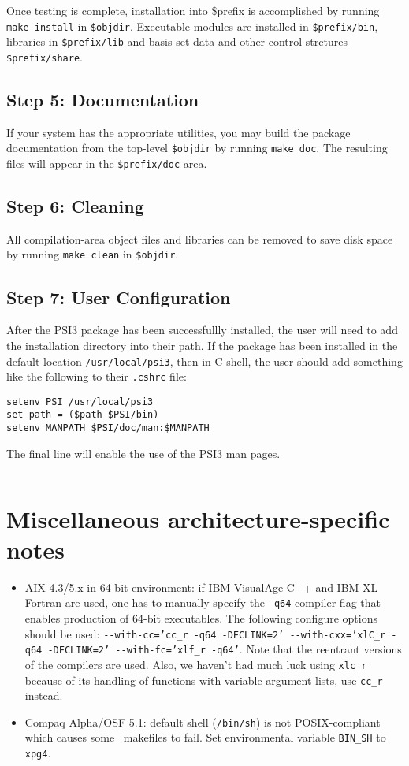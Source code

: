 \documentclass[12pt]{article}
\begin{document}
Once testing is complete, installation into \$prefix is accomplished by
running {\tt make install} in {\tt \$objdir}.   Executable modules are
installed in {\tt \$prefix/bin}, libraries in {\tt \$prefix/lib} and basis 
set data and other control strctures {\tt \$prefix/share}.

\subsection{Step 5: Documentation}

If your system has the appropriate utilities, you may build the package
documentation from the top-level {\tt \$objdir} by running {\tt make doc}.  
The resulting files will appear in the {\tt \$prefix/doc} area.

\subsection{Step 6: Cleaning}

All compilation-area object files and libraries can be removed to save
disk space by running {\tt make clean} in {\tt \$objdir}.

\subsection{Step 7: User Configuration}

After the PSI3 package has been successfullly installed, the user will
need to add the installation directory into their path.  If the package
has been installed in the default location {\tt /usr/local/psi3}, then
in C shell, the user should add something like the following to 
their {\tt .cshrc} file:
\begin{verbatim}
setenv PSI /usr/local/psi3
set path = ($path $PSI/bin)
setenv MANPATH $PSI/doc/man:$MANPATH
\end{verbatim}
The final line will enable the use of the PSI3 man pages.
\begin{verbatim}
\end{verbatim}


\section{Miscellaneous architecture-specific notes}
\begin{itemize}
\item AIX 4.3/5.x in 64-bit environment:
if IBM VisualAge C++ and IBM XL Fortran are used,
one has to manually specify
the {\tt -q64} compiler flag
that enables production of 64-bit executables.
The following configure options should be used:
{\tt -}{\tt -with-cc='cc\_r -q64 -DFCLINK=2' -}{\tt -with-cxx='xlC\_r -q64
-DFCLINK=2' -}{\tt -with-fc='xlf\_r -q64'}. Note that
the reentrant versions of the compilers
are used. Also, we haven't had much luck
using {\tt xlc\_r} because of its
handling of functions with variable argument lists,
use {\tt cc\_r} instead.
\item Compaq Alpha/OSF 5.1: default shell ({\tt /bin/sh})
is not POSIX-compliant which causes some \PSIthree\ makefiles
to fail. Set environmental variable {\tt BIN\_SH} to {\tt xpg4}.
\end{itemize}
\end{document}
